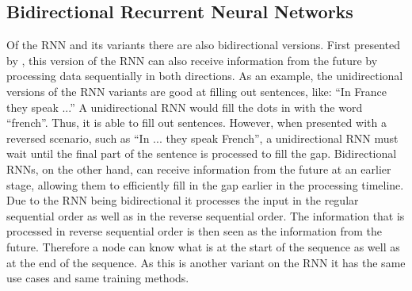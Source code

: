 \documentclass[conference]{IEEEtran}
\begin{document}
\subsection{Bidirectional Recurrent Neural Networks} \label{BiRNN}
Of the RNN and its variants there are also bidirectional versions. First presented by \cite{schuster1997bidirectional}, this version of the RNN can also receive information from the future by processing data sequentially in both directions. As an example, the unidirectional versions of the RNN variants are good at filling out sentences, like: ``In France they speak ...'' A unidirectional RNN would fill the dots in with the word ``french''. Thus, it is able to fill out sentences. However, when presented with a reversed scenario, such as ``In ... they speak French'', a unidirectional RNN must wait until the final part of the sentence is processed to fill the gap. Bidirectional RNNs, on the other hand, can receive information from the future at an earlier stage, allowing them to efficiently fill in the gap earlier in the processing timeline. Due to the RNN being bidirectional it processes the input in the regular sequential order as well as in the reverse sequential order. The information that is processed in reverse sequential order is then seen as the information from the future. Therefore a node can know what is at the start of the sequence as well as at the end of the sequence. As this is another variant on the RNN it has the same use cases and same training methods.
\end{document}
